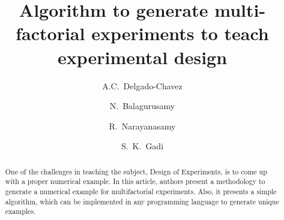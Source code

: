 \documentclass[twocolumn]{svjour3}          %
\begin{document}
\title{Algorithm to generate multi-factorial experiments to teach experimental design%
}
\author{A.C.~Delgado-Chavez  \and
        N.~Balagurusamy \and
        R.~Narayanasamy \and
        S.~K.~Gadi
}
\maketitle
\begin{abstract}
One of the challenges in teaching the subject, Design of Experiments, is to come up with a proper numerical example. In this article, authors present a methodology to generate a numerical example for multifactorial experiments. Also, it presents a simple algorithm, which can be implemented in any programming language to generate unique examples.
\end{abstract}
\end{document}
